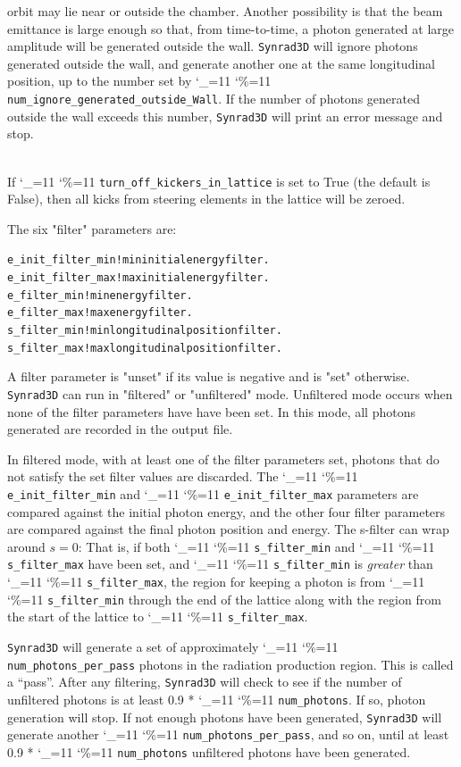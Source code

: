 \documentclass[11pt]{article}
\newcommand{\srthree}{\texttt{Synrad3D}\xspace}
\newcommand\ttcmd{\begingroup\catcode`\_=11 \catcode`\%=11 \dottcmd}
\newcommand\dottcmd[1]{\texttt{#1}\endgroup}
\newcommand{\vn}{\ttcmd}
\newcommand{\Newline}{\hfil \\}
\newlength{\ExBeg}
\newlength{\ExEnd}
\newenvironment{example}
  {\vspace{\ExBeg} \begin{alltt}}
  {\end{alltt} \vspace{\ExEnd}}
\begin{document}
\begin{description}
orbit may lie near or outside the chamber. Another possibility is that
the beam emittance is large enough so that, from time-to-time, a
photon generated at large amplitude will be generated outside the
wall. \srthree will ignore photons generated outside the wall, and
generate another one at the same longitudinal position, up to the
number set by \vn{num_ignore_generated_outside_Wall}. If the number of
photons generated outside the wall exceeds this number, \srthree will
print an error message and stop.
  \item[\vn{turn_off_kickers_in_lattice}] \Newline
If \vn{turn_off_kickers_in_lattice} is set to True (the default is
False), then all kicks from steering elements in the lattice will be zeroed.

\end{description}

The six "filter" parameters are:
\begin{example}
  e_init_filter_min   ! min initial energy filter.
  e_init_filter_max   ! max initial energy filter.
  e_filter_min        ! min energy filter.
  e_filter_max        ! max energy filter.
  s_filter_min        ! min longitudinal position filter.
  s_filter_max        ! max longitudinal position filter.
\end{example}
A filter parameter is "unset" if its value is negative and is "set"
otherwise.  \srthree can run in "filtered" or "unfiltered"
mode. Unfiltered mode occurs when none of the filter parameters have
have been set. In this mode, all photons generated are recorded in
the output file.

In filtered mode, with at least one of the filter parameters set,
photons that do not satisfy the set filter values are discarded. The
\vn{e_init_filter_min} and \vn{e_init_filter_max} parameters are 
compared against the initial photon energy, and the other four
filter parameters are compared against the final photon position and
energy. The s-filter can wrap around $s = 0$: That is,
if both \vn{s_filter_min} and \vn{s_filter_max} have been set,
and \vn{s_filter_min} is {\em greater} than \vn{s_filter_max}, the region
for keeping a photon is from \vn{s_filter_min} through the end of the
lattice along with the region from the start of the lattice to
\vn{s_filter_max}.

\srthree will generate a set of approximately
\vn{num_photons_per_pass} photons in the radiation production region.
This is called a ``pass''.  After any filtering, \srthree will check
to see if the number of unfiltered photons is at least 0.9 *
\vn{num_photons}. If so, photon generation will stop. If not enough
photons have been generated, \srthree will generate another
\vn{num_photons_per_pass}, and so on, until at least 0.9 *
\vn{num_photons} unfiltered photons have been generated.
\end{document}
